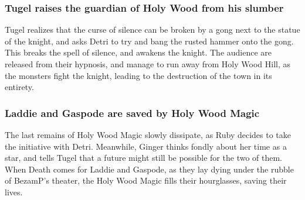 \subsubsection{\Gls{Tugel} raises the guardian of Holy Wood from his slumber}
\Gls{Tugel} realizes that the curse of silence can be broken by a gong next to the statue of the
knight, and asks \Gls{Detri} to try and bang the rusted hammer onto the gong. This breaks the spell
of silence, and awakens the knight. The audience are released from their hypnosis, and manage to
run away from Holy Wood Hill, as the monsters fight the knight, leading to the destruction of the
town in its entirety.

\subsubsection{\Gls{Laddie} and \Gls{Gaspode} are saved by Holy Wood Magic}
The last remains of Holy Wood Magic slowly dissipate, as \Gls{Ruby} decides to take the initiative
with \Gls{Detri}. Meanwhile, \Gls{Ginger} thinks fondly about her time as a star, and tells
\Gls{Tugel} that a future might still be possible for the two of them. When \Gls{Death} comes for
\Gls{Laddie} and \Gls{Gaspode}, as they lay dying under the rubble of \Gls{BezamP}'s theater, the
Holy Wood Magic fills their hourglasses, saving their lives.
